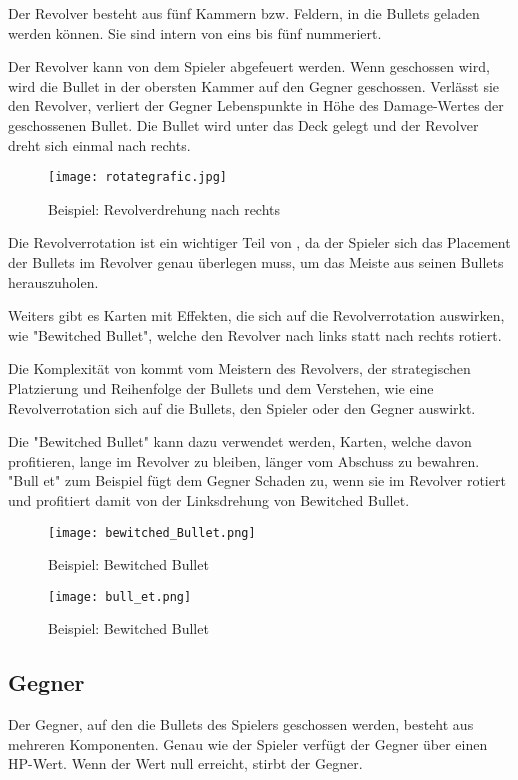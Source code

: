 Der Revolver besteht aus fünf Kammern bzw. Feldern, in die Bullets geladen werden können.
Sie sind intern von eins bis fünf nummeriert.


Der Revolver kann von dem Spieler abgefeuert werden. Wenn geschossen wird, wird die Bullet in der obersten Kammer auf den Gegner geschossen.
Verlässt sie den Revolver, verliert der Gegner Lebenspunkte in Höhe des Damage-Wertes der geschossenen Bullet.
Die Bullet wird unter das Deck gelegt und der Revolver dreht sich einmal nach rechts.

\begin{figure}[H]
    \texttt{[image: rotategrafic.jpg]}
    \caption{Beispiel: Revolverdrehung nach rechts}
\end{figure}


Die Revolverrotation ist ein wichtiger Teil von \FF, da der Spieler sich das Placement der Bullets im Revolver genau überlegen muss,
um das Meiste aus seinen Bullets herauszuholen.


Weiters gibt es Karten mit Effekten, die sich auf die Revolverrotation auswirken, wie \zB "Bewitched Bullet",
welche den Revolver nach links statt nach rechts rotiert.


Die Komplexität von \FF kommt vom Meistern des Revolvers, der strategischen Platzierung und Reihenfolge der Bullets und dem Verstehen,
wie eine Revolverrotation sich auf die Bullets, den Spieler oder den Gegner auswirkt.


Die "Bewitched Bullet" kann \zB dazu verwendet werden, Karten,
welche davon profitieren, lange im Revolver zu bleiben, länger vom Abschuss zu bewahren. "Bull et" zum Beispiel fügt dem Gegner Schaden zu,
wenn sie im Revolver rotiert und profitiert damit von der Linksdrehung von Bewitched Bullet.


\begin{figure}[H]
    \texttt{[image: bewitched\_Bullet.png]}
    \caption{Beispiel: Bewitched Bullet}
\end{figure}

\begin{figure}[H]
    \texttt{[image: bull\_et.png]}
    \caption{Beispiel: Bewitched Bullet}
\end{figure}


\subsection{Gegner}\label{gegner}
Der Gegner, auf den die Bullets des Spielers geschossen werden, besteht aus mehreren Komponenten.
Genau wie der Spieler verfügt der Gegner über einen HP-Wert. Wenn der Wert null erreicht, stirbt der Gegner.



